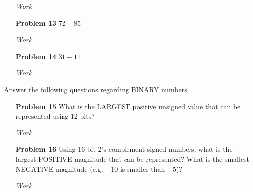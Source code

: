 \documentclass[12pt]{article}
\begin{document}
\begin{enumerate}
  \item[\textit{Work}]
\end{enumerate}


\begin{enumerate}
  \item[\textbf{Problem 13}] $72-85$
\end{enumerate}

\begin{enumerate}
  \item[\textit{Work}]
\end{enumerate}


\begin{enumerate}
  \item[\textbf{Problem 14}] $31-11$
\end{enumerate}

\begin{enumerate}
  \item[\textit{Work}]
\end{enumerate}

\noindent Answer the following questions regarding BINARY numbers.
\begin{enumerate}
  \item[\textbf{Problem 15}] What is the LARGEST positive unsigned value that can be represented using 12 bits?
\end{enumerate}

\begin{enumerate}
  \item[\textit{Work}]
\end{enumerate}


\begin{enumerate}
  \item[\textbf{Problem 16}] Using 16-bit 2’s complement signed numbers, what is the largest POSITIVE magnitude that can be represented?  What is the smallest NEGATIVE magnitude (e.g. $-10$ is smaller than $-5$)?
\end{enumerate}

\begin{enumerate}
  \item[\textit{Work}]
\end{enumerate}
\end{document}
